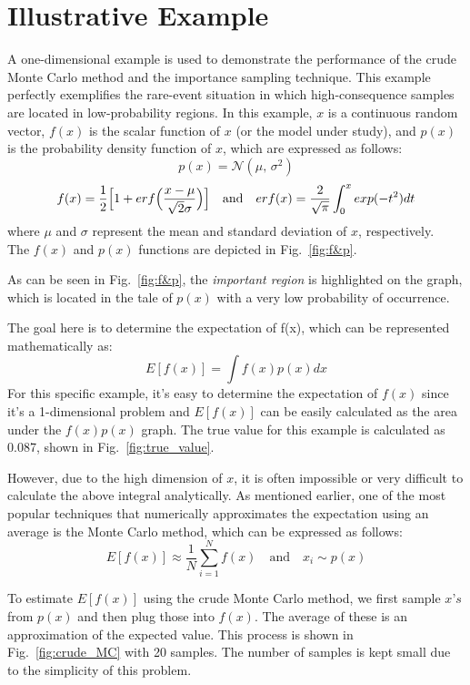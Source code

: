 \section{Illustrative Example}
    \normalsize 
    A one-dimensional example is used to demonstrate the performance of the crude Monte Carlo method and the importance sampling technique. This example perfectly exemplifies the rare-event situation in which high-consequence samples are located in low-probability regions. 
    In this example, $x$ is a continuous random vector, $f(x)$ is the scalar function of $x$ (or the model under study), and $p(x)$ is the probability density function of $x$, which are expressed as follows: 
    $$p(x)=\mathcal{N}(\mu,\,\sigma^{2})$$
    $$f(x)=\frac{1}{2} \Bigr[ 1+erf \Bigl( \frac{x-\mu}{\sqrt{2}\sigma} \Bigl) \Bigr] \quad \text{and} \quad erf(x)=\frac{2}{\sqrt{\pi}}\int_{0}^{x}exp(-t^2)dt$$
    where $\mu$ and $\sigma$ represent the mean and standard deviation of $x$, respectively. \\
    The $f(x)$ and $p(x)$ functions are depicted in Fig.~\ref{fig:f&p}.
    
    

    As can be seen in Fig.~\ref{fig:f&p}, the \textit{important region} is highlighted on the graph, which is located in the tale of $p(x)$ with a very low probability of occurrence. 
    
    The goal here is to determine the expectation of f(x), which can be represented mathematically as:
    $$ E[f(x)]=\int f(x)p(x)dx $$
    For this specific example, it's easy to determine the expectation of $f(x)$ since it's a 1-dimensional problem and $ E[f(x)] $ can be easily calculated as the area under the $f(x)p(x)$ graph. The true value for this example is calculated as 0.087, shown in Fig.~\ref{fig:true_value}.
    
    
    
    However, due to the high dimension of $x$, it is often impossible or very difficult to calculate the above integral analytically. As mentioned earlier, one of the most popular techniques that numerically approximates the expectation using an average is the Monte Carlo method, which can be expressed as follows:
    $$E[f(x)] \approx \frac{1}{N}\sum_{i=1}^{N} f(x) \quad \text{and} \quad x_i\sim p(x)$$  
    
    To estimate $E[f(x)]$ using the crude Monte Carlo method, we first sample $x’s$ from $p(x)$ and then plug those into $f(x)$. The average of these is an approximation of the expected value. This process is shown in Fig.~\ref{fig:crude_MC} with 20 samples. The number of samples is kept small due to the simplicity of this problem. \\

